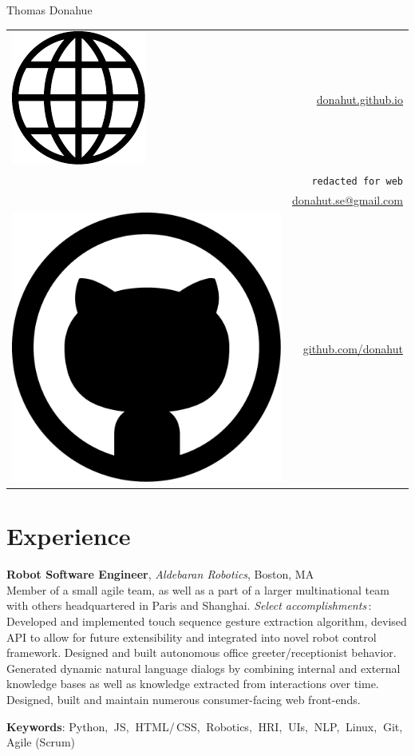 \documentclass[10pt, letter]{article}
\newcommand*\globe{\includegraphics[height=1.6ex]{globe.pdf}}
\newcommand*\github{\includegraphics[height=2ex]{github.pdf}}
\newcommand{\years}[1]{\marginnote{\footnotesize #1}}
\newenvironment{desc*}{
  \begin{description}
    \setlength{\itemsep}{0.2pt}
    \setlength{\parskip}{-1pt}
    \setlength{\parsep}{0pt}
  }{
  \end{description}
}
\begin{document}
\begin{minipage}[t]{0.55\textwidth}
  {\Huge Thomas Donahue}
\end{minipage}
\begin{minipage}[t]{0.45\textwidth}
  \flushright 
  \begin{tabular}[h]{lr}
    \globe{}    & \href{http://donahut.github.io}{donahut.github.io}\\    
    \Phone{}    & \texttt{redacted for web}\\
    \Envelope{} & \href{mailto:donahut.se@gmail.com}{donahut.se@gmail.com}\\    
    \github{}   & \href{http://www.github.com/donahut}{github.com/donahut}
  \end{tabular}
\end{minipage}

\section*{Experience}
\years{Mar 2014 --} 
\textbf{\fontsize{10.5pt}{1em}\selectfont Robot Software Engineer},
\textsl{Aldebaran Robotics}, Boston, MA\\

\vspace{-.3cm} 
Member of a small agile team, as well as a part of a larger
multinational team with others headquartered in Paris and Shanghai.
\textsl{Select accomplishments}\,:\, Developed and implemented touch
sequence gesture extraction algorithm, devised API to allow for future
extensibility and integrated into novel robot control framework.
Designed and built autonomous office greeter/receptionist behavior.
Generated dynamic natural language dialogs by combining internal and
external knowledge bases as well as knowledge extracted from
interactions over time. Designed, built and maintain numerous
consumer-facing web front-ends.
\vspace{-.1cm}
\begin{desc*}
\item[\rm \textbf{Keywords}:] Python,$\:$ JS,$\:$ HTML/\,CSS,$\:$
  Robotics,$\:$ HRI,$\:$ UIs,$\:$ NLP,$\:$ Linux,$\:$ Git,$\:$ Agile (Scrum)\\
\end{desc*}
\end{document}
